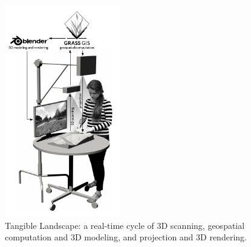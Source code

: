 \documentclass[Afour,sagev,times]{sagej} %
\begin{document}
\begin{figure}
    \begin{center}
        \includegraphics[width=0.45\textwidth]{images/diagrams/rendered_diagram_2.pdf}
        \caption{Tangible Landscape: a real-time cycle of 3D scanning, geospatial computation and 3D modeling, and projection and 3D rendering.}
        \label{fig:system_diagram}
    \end{center}
\end{figure}
\end{document}
